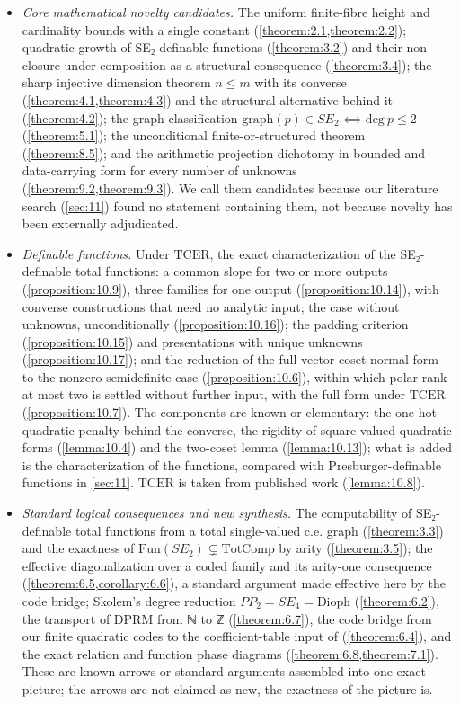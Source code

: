 \documentclass[11pt]{article}
\theoremstyle{plain}
\theoremstyle{definition}
\theoremstyle{remark}
\theoremstyle{plain}
\theoremstyle{definition}
\theoremstyle{remark}
\theoremstyle{plain}
\theoremstyle{definition}
\theoremstyle{remark}
\begin{document}
\begin{itemize}
\item \emph{Core mathematical novelty candidates.} The uniform finite-fibre height and cardinality bounds with a single constant (\cref{theorem:2.1,theorem:2.2}); quadratic growth of SE₂-definable functions (\cref{theorem:3.2}) and their non-closure under composition as a structural consequence (\cref{theorem:3.4}); the sharp injective dimension theorem $n ≤ m$ with its converse (\cref{theorem:4.1,theorem:4.3}) and the structural alternative behind it (\cref{theorem:4.2}); the graph classification $\mathrm{graph}(p) ∈ SE_{2} ⟺ \mathrm{deg}\ p ≤ 2$ (\cref{theorem:5.1}); the unconditional finite-or-structured theorem (\cref{theorem:8.5}); and the arithmetic projection dichotomy in bounded and data-carrying form for every number of unknowns (\cref{theorem:9.2,theorem:9.3}). We call them candidates because our literature search (\cref{sec:11}) found no statement containing them, not because novelty has been externally adjudicated.
\item \emph{Definable functions.} Under $\mathrm{TCER}$, the exact characterization of the SE₂-definable total functions: a common slope for two or more outputs (\cref{proposition:10.9}), three families for one output (\cref{proposition:10.14}), with converse constructions that need no analytic input; the case without unknowns, unconditionally (\cref{proposition:10.16}); the padding criterion (\cref{proposition:10.15}) and presentations with unique unknowns (\cref{proposition:10.17}); and the reduction of the full vector coset normal form to the nonzero semidefinite case (\cref{proposition:10.6}), within which polar rank at most two is settled without further input, with the full form under $\mathrm{TCER}$ (\cref{proposition:10.7}). The components are known or elementary: the one-hot quadratic penalty behind the converse, the rigidity of square-valued quadratic forms (\cref{lemma:10.4}) and the two-coset lemma (\cref{lemma:10.13}); what is added is the characterization of the functions, compared with Presburger-definable functions in \cref{sec:11}. $\mathrm{TCER}$ is taken from published work (\cref{lemma:10.8}).
\item \emph{Standard logical consequences and new synthesis.} The computability of SE₂-definable total functions from a total single-valued c.e. graph (\cref{theorem:3.3}) and the exactness of $\mathrm{Fun}(SE_{2}) ⊊ \mathrm{TotComp}$ by arity (\cref{theorem:3.5}); the effective diagonalization over a coded family and its arity-one consequence (\cref{theorem:6.5,corollary:6.6}), a standard argument made effective here by the code bridge; Skolem's degree reduction $PP_{2} = SE_{4} = \mathrm{Dioph}$ (\cref{theorem:6.2}), the transport of DPRM from ℕ to ℤ (\cref{theorem:6.7}), the code bridge from our finite quadratic codes to the coefficient-table input of \cite{GS04} (\cref{theorem:6.4}), and the exact relation and function phase diagrams (\cref{theorem:6.8,theorem:7.1}). These are known arrows or standard arguments assembled into one exact picture; the arrows are not claimed as new, the exactness of the picture is.

\end{itemize}
\end{document}
